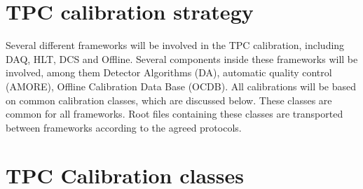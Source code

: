 \documentclass[a4paper,12pt]{article}
\begin{document}
\section*{TPC calibration strategy}
Several different frameworks will be involved in the TPC calibration, including DAQ, HLT, DCS and Offline. Several components inside these frameworks will be involved, among them Detector Algorithms (DA), automatic quality control (AMORE), Offline Calibration Data Base (OCDB).
All calibrations will be based on common calibration classes, which are discussed below. These classes are common for all frameworks. Root files containing these classes are transported between frameworks according to the agreed protocols.

\section{TPC Calibration classes}
\end{document}
